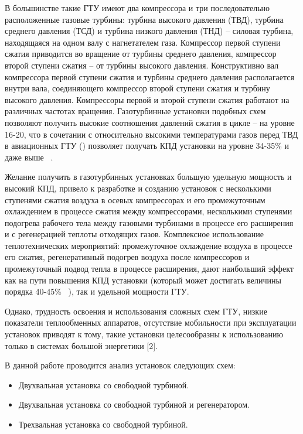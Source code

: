 В большинстве такие ГТУ имеют два компрессора и три последовательно расположенные газовые турбины: турбина высокого
давления (ТВД), турбина среднего давления (ТСД) и турбина низкого давления (ТНД) – силовая турбина, находящаяся на одном
валу с нагнетателем газа. Компрессор первой ступени сжатия приводится во вращение от турбины среднего  давления,
компрессор второй ступени сжатия – от турбины высокого давления. Конструктивно вал компрессора первой ступени сжатия и
турбины среднего давления   располагается внутри вала, соединяющего компрессор второй ступени сжатия и турбину высокого
давления.  Компрессоры первой и второй ступени сжатия  работают на различных частотах вращения. Газотурбинные установки
подобных схем позволяют получить высокие соотношения давлений сжатия в цикле – на уровне 16-20, что в сочетании с относительно
высокими температурами газов перед ТВД в авиационных ГТУ () позволяет получать КПД установки на уровне 34-35\% и даже выше ~\cite{gtd_tomsk}.

Желание получить в газотурбинных установках большую удельную мощность и высокий КПД, привело к разработке и созданию
установок с несколькими ступенями сжатия воздуха в осевых компрессорах и его промежуточным охлаждением в процессе сжатия
между компрессорами, несколькими ступенями подогрева рабочего тела между газовыми турбинами в процессе его расширения и с
регенерацией теплоты отходящих газов. Комплексное использование теплотехнических мероприятий: промежуточное охлаждение воздуха
в процессе его сжатия, регенеративный подогрев воздуха после компрессоров и промежуточный подвод тепла в процессе расширения,
дают наибольший эффект как на пути повышения КПД установки (который может достигать величины порядка 40-45\% ~\cite{gtd_oil_and_gas}),
так  и удельной мощности ГТУ.

Однако, трудность освоения и использования сложных схем ГТУ,  низкие показатели теплообменных аппаратов,  отсутствие мобильности при эксплуатации установок приводят к тому, такие установки целесообразны к использованию только в системах большой энергетики [2].

В данной работе проводится анализ установок следующих схем:
\begin{itemize}
	\item Двухвальная установка со свободной турбиной.
	\item Двухвальная установка со свободной турбиной и регенератором.
	\item Трехвальная установка со свободной турбиной.
\end{itemize}

